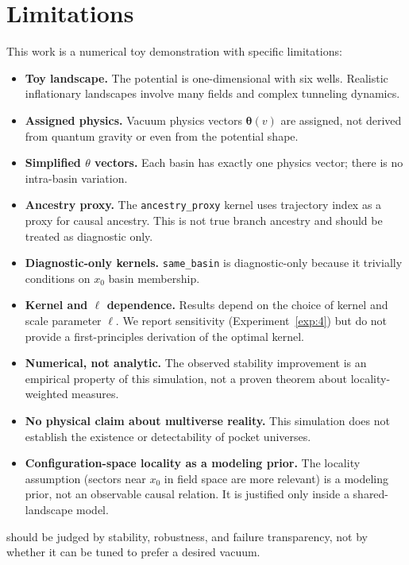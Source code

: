 \section{Limitations}
\label{sec:limitations}

This work is a numerical toy demonstration with specific limitations:

\begin{itemize}
  \item \textbf{Toy landscape.} The potential is one-dimensional with six
        wells. Realistic inflationary landscapes involve many fields and
        complex tunneling dynamics.
  \item \textbf{Assigned physics.} Vacuum physics vectors
        $\boldsymbol{\theta}(v)$ are assigned, not derived from quantum
        gravity or even from the potential shape.
  \item \textbf{Simplified $\theta$ vectors.} Each basin has exactly one
        physics vector; there is no intra-basin variation.
  \item \textbf{Ancestry proxy.} The \texttt{ancestry\_proxy} kernel uses
        trajectory index as a proxy for causal ancestry. This is not true
        branch ancestry and should be treated as diagnostic only.
  \item \textbf{Diagnostic-only kernels.} \texttt{same\_basin} is
        diagnostic-only because it trivially conditions on $x_0$ basin
        membership.
  \item \textbf{Kernel and $\ell$ dependence.} Results depend on the choice
        of kernel and scale parameter $\ell$. We report sensitivity
        (Experiment~\ref{exp:4}) but do not provide a first-principles derivation
        of the optimal kernel.
  \item \textbf{Numerical, not analytic.} The observed stability improvement
        is an empirical property of this simulation, not a proven theorem
        about locality-weighted measures.
  \item \textbf{No physical claim about multiverse reality.} This simulation
        does not establish the existence or detectability of pocket universes.
  \item \textbf{Configuration-space locality as a modeling prior.} The locality
        assumption (sectors near $x_0$ in field space are more relevant) is a
        modeling prior, not an observable causal relation. It is justified only
        inside a shared-landscape model.
\end{itemize}

\ISR should be judged by stability, robustness, and failure transparency,
not by whether it can be tuned to prefer a desired vacuum.
